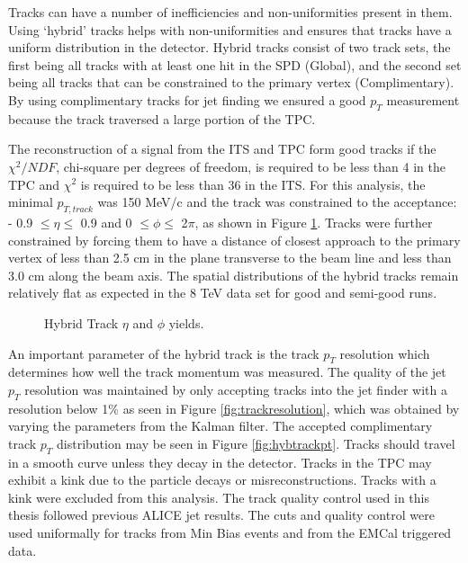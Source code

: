 Tracks can have a number of inefficiencies and non-uniformities present in them.  Using `hybrid' tracks helps with non-uniformities and ensures that tracks have a uniform distribution in the detector.  Hybrid tracks consist of two track sets, the first being all tracks with at least one hit in the SPD (Global), and the second set being all tracks that can be constrained to the primary vertex (Complimentary).  By using complimentary tracks for jet finding we ensured a good $p_{T}$ measurement because the track traversed a large portion of the TPC.  

The reconstruction of a signal from the ITS and TPC form good tracks if the $\chi^{2}/NDF$, chi-square per degrees of freedom, is required to be less than 4 in the TPC and $\chi^{2}$ is required to be less than 36 in the ITS. For this analysis, the minimal $p_{T, track}$ was 150 MeV/c and the track was constrained to the acceptance: - 0.9 $\leq \eta \leq$ 0.9 and 0 $\leq \phi \leq$ 2$\pi$, as shown in Figure \ref{fig:Hybridtracketaphi}. Tracks were further constrained by forcing them to have a distance of closest approach to the primary vertex of less than 2.5 cm in the plane transverse to the beam line and less than 3.0 cm along the beam axis.  The spatial distributions of the hybrid tracks remain relatively flat as expected in the 8 TeV data set for good and semi-good runs.

\begin{figure}%
    \centering
    \qquad
    \caption{Hybrid Track $\eta$ and $\phi$ yields.}%
    \label{fig:Hybridtracketaphi}%
\end{figure}


An important parameter of the hybrid track is the track $p_{T}$ resolution which determines how well the track momentum was measured.  The quality of the jet $p_{T}$ resolution was maintained by only accepting tracks into the jet finder with a resolution below 1\% as seen in Figure \ref{fig:trackresolution}, which was obtained by varying the parameters from the Kalman filter.  The accepted complimentary track $p_{T}$ distribution may be seen in Figure \ref{fig:hybtrackpt}.  Tracks should travel in a smooth curve unless they decay in the detector.  Tracks in the TPC may exhibit a kink due to the particle decays or misreconstructions.  Tracks with a kink were excluded from this analysis.  The track quality control used in this thesis followed previous ALICE jet results\cite{Acharya:2018eat}.  The cuts and quality control were used uniformally for tracks from Min Bias events and from the EMCal triggered data.

